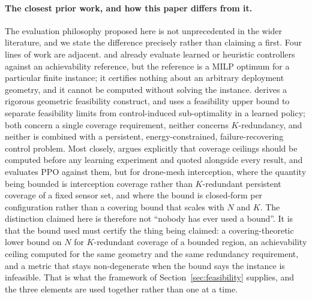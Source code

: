 \documentclass[conference]{IEEEtran}
\begin{document}
\paragraph{The closest prior work, and how this paper differs from it.}
The evaluation philosophy proposed here is not unprecedented in the wider literature, and we state the difference precisely rather than claiming a first. Four lines of work are adjacent. \cite{song2024} and \cite{fan2026} already evaluate learned or heuristic controllers against an achievability reference, but the reference is a MILP optimum for a particular finite instance; it certifies nothing about an arbitrary deployment geometry, and it cannot be computed without solving the instance. \cite{datta2025} derives a rigorous geometric feasibility construct, and \cite{viana2026} uses a feasibility upper bound to separate feasibility limits from control-induced sub-optimality in a learned policy; both concern a single coverage requirement, neither concerns $K$-redundancy, and neither is combined with a persistent, energy-constrained, failure-recovering control problem. Most closely, \cite{ceilings2026} argues explicitly that coverage ceilings should be computed before any learning experiment and quoted alongside every result, and evaluates PPO against them, but for drone-mesh interception, where the quantity being bounded is interception coverage rather than $K$-redundant persistent coverage of a fixed sensor set, and where the bound is closed-form per configuration rather than a covering bound that scales with $N$ and $K$. The distinction claimed here is therefore not ``nobody has ever used a bound''. It is that the bound used must certify the thing being claimed: a covering-theoretic lower bound on $N$ for $K$-redundant coverage of a bounded region, an achievability ceiling computed for the same geometry and the same redundancy requirement, and a metric that stays non-degenerate when the bound says the instance is infeasible. That is what the framework of Section~\ref{sec:feasibility} supplies, and the three elements are used together rather than one at a time.
\end{document}

